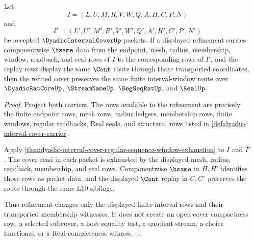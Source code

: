 \begin{theorem}
\label{thm:dyadicintervalcover-refinement-stability}
Let
$$
I=(L,U,M,R,V,W,Q,A,H,C,P,N)
$$
and
$$
I'=(L',U',M',R',V',W',Q',A',H',C',P',N')
$$
be accepted $\DyadicIntervalCoverUp$ packets. If a displayed refinement carries componentwise $\hsame$ data from the endpoint, mesh, radius, membership, window, readback, and seal rows of $I$ to the corresponding rows of $I'$, and the replay rows display the same $\Cont$ route through those transported coordinates, then the refined cover preserves the same finite interval-window route over $\DyadicRatCoreUp$, $\StreamNameUp$, $\RegSeqRatUp$, and $\RealUp$.
\end{theorem}
\begin{proof}
Project both carriers. The rows available to the refinement are precisely the finite endpoint rows, mesh rows, radius ledgers, membership rows, finite windows, regular readbacks, Real seals, and structural rows listed in \autoref{def:dyadic-interval-cover-carrier}.

Apply \autoref{thm:dyadic-interval-cover-regular-sequence-window-exhaustion} to $I$ and $I'$. The cover read in each packet is exhausted by the displayed mesh, radius, readback, membership, and seal rows. Componentwise $\hsame$ in $H,H'$ identifies those rows as packet data, and the displayed $\Cont$ replay in $C,C'$ preserves the route through the same L10 siblings.

Thus refinement changes only the displayed finite interval rows and their transported membership witnesses. It does not create an open-cover compactness row, a selected subcover, a host equality test, a quotient stream, a choice functional, or a Real-completeness witness.
\end{proof}

